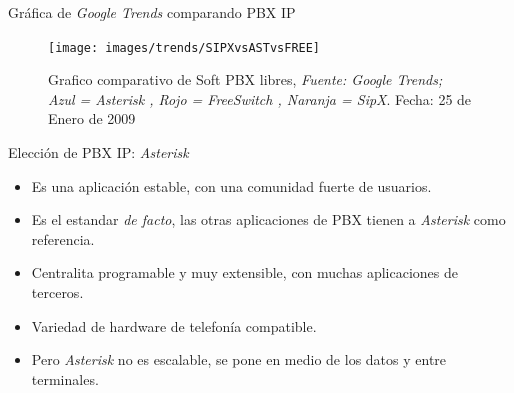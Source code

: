 \documentclass{beamer}
\begin{document}
\begin{frame}{Gráfica de \emph{Google Trends} comparando PBX IP}
  \begin{figure}
    \centering
    \texttt{[image: images/trends/SIPXvsASTvsFREE]}
    \caption{Grafico comparativo de Soft PBX libres,  \emph{Fuente: Google Trends; Azul = \emph{Asterisk} , Rojo = FreeSwitch , Naranja = SipX}. Fecha: 25 de Enero de 2009}
  \end{figure}
\end{frame}

\begin{frame}
  \begin{block}{Elección de PBX IP: \emph{Asterisk}}
    \begin{itemize}[<+- |alert@+>]
    \item Es una aplicación estable, con una comunidad fuerte de usuarios.
    \item Es el estandar \emph{de facto}, las otras aplicaciones de PBX tienen a \emph{Asterisk} como referencia.
    \item Centralita programable y muy extensible, con muchas aplicaciones de terceros.
    \item Variedad de hardware de telefonía compatible.
    \item Pero \emph{Asterisk} no es escalable, se pone en medio de los datos y entre terminales.
    \end{itemize}
  \end{block}
\end{frame}
\end{document}
